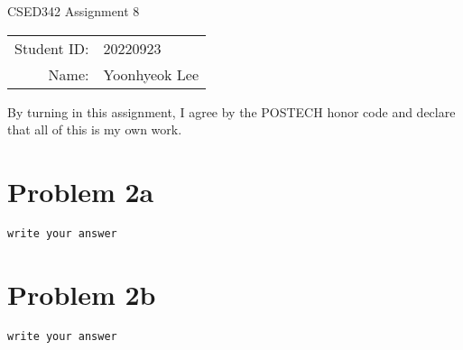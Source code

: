 \documentclass[12pt]{article}
\begin{document}
\begin{center}
{\Large CSED342 Assignment 8 \vspace{10pt}}

\begin{tabular}{rl}
Student ID: & 20220923 \\
Name: & Yoonhyeok Lee \\
\end{tabular}
\end{center}

\begin{center}
By turning in this assignment, I agree by the POSTECH honor code and declare that all of this is my own work.
\end{center}

\section*{Problem 2a}

\verb|write your answer|

\section*{Problem 2b}

\verb|write your answer|
\end{document}
